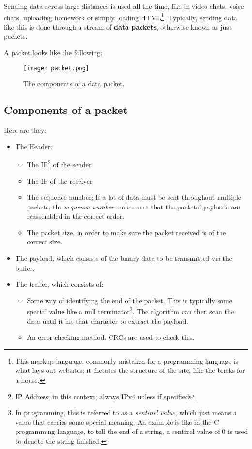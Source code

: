 \documentclass[../main.tex]{subfiles}
\begin{document}
\label{2:sec:packet_switching}

Sending data across large distances is used all the time, like in video chats, voice chats, uploading homework or simply loading HTML\footnote{This markup language, commonly mistaken for a programming language is what lays out websites; it dictates the structure of the site, like the bricks for a house.}. Typically, sending data like this is done through a stream of \textbf{data packets}, otherwise known as just packets.

A packet looks like the following:

\begin{figure}[h]
    \centering
    \texttt{[image: packet.png]}
    \caption{The components of a data packet.}
    \label{fig:packet}
\end{figure}

\subsection{Components of a packet}

Here are they:

\begin{itemize}

\item The Header:
    \begin{itemize}
    \item The IP\footnote{IP Address; in this context, always IPv4 unless if specified} of the sender
    \item The IP of the receiver
    \item The sequence number; If a lot of data must be sent throughout multiple packets, the
          \emph{sequence number} makes sure that the packets' payloads are reassembled in the correct order.
    \item The packet size, in order to make sure the packet received is of the correct size.
    \end{itemize}

\item The payload, which consists of the binary data to be transmitted via the buffer.

\item The trailer, which consists of:
    \begin{itemize}
    \item Some way of identifying the end of the packet. This is typically some special value like a null terminator\footnote{In programming,
          this is referred to as a \emph{sentinel value}, which just means a value that carries some special meaning. An example is like in the
          C programming language, to tell the end of a string, a sentinel value of 0 is used to denote the string finished.}. The algorithm can
          then scan the data until it hit that character to extract the payload.
    \item An error checking method. CRCs are used to check this.
    \end{itemize}
\end{itemize}
\end{document}
